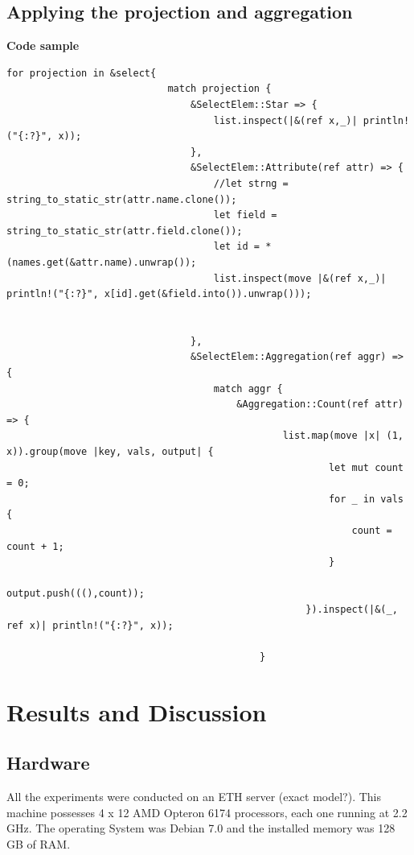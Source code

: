 \documentclass[11pt,singlecolumn]{scrartcl}
\begin{document}
\subsection{Applying the projection and aggregation}
\textbf{Code sample}
\begin{lstlisting}
for projection in &select{
                            match projection {
                                &SelectElem::Star => {
                                    list.inspect(|&(ref x,_)| println!("{:?}", x));
                                },
                                &SelectElem::Attribute(ref attr) => {
                                    //let strng = string_to_static_str(attr.name.clone());
                                    let field = string_to_static_str(attr.field.clone());
                                    let id = *(names.get(&attr.name).unwrap());
                                    list.inspect(move |&(ref x,_)| println!("{:?}", x[id].get(&field.into()).unwrap()));
                                    
                                    
                                },
                                &SelectElem::Aggregation(ref aggr) => {
                                    match aggr {
                                        &Aggregation::Count(ref attr) => {
                                                list.map(move |x| (1, x)).group(move |key, vals, output| {
                                                        let mut count = 0;
                                                        for _ in vals {
                                                            count = count + 1;
                                                        }                                                        
                                                        output.push(((),count));
                                                    }).inspect(|&(_, ref x)| println!("{:?}", x));
                                                
                                            }
 \end{lstlisting} 
\clearpage


\section{Results and Discussion}

\subsection{Hardware}
All the experiments were conducted on an ETH server (exact model?). This machine possesses 4 x 12 AMD Opteron 6174 processors, each one running at 2.2 GHz. The operating System was Debian 7.0 and the installed memory was 128 GB of RAM.
\end{document}
